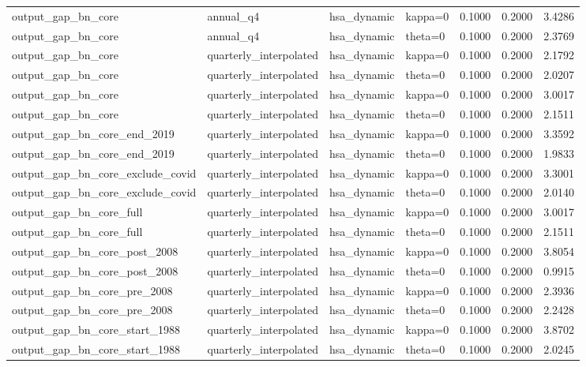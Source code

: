 \begin{tabular}{llllrrr}
output\_gap\_bn\_core & annual\_q4 & hsa\_dynamic & kappa=0 & 0.1000 & 0.2000 & 3.4286 \\
output\_gap\_bn\_core & annual\_q4 & hsa\_dynamic & theta=0 & 0.1000 & 0.2000 & 2.3769 \\
output\_gap\_bn\_core & quarterly\_interpolated & hsa\_dynamic & kappa=0 & 0.1000 & 0.2000 & 2.1792 \\
output\_gap\_bn\_core & quarterly\_interpolated & hsa\_dynamic & theta=0 & 0.1000 & 0.2000 & 2.0207 \\
output\_gap\_bn\_core & quarterly\_interpolated & hsa\_dynamic & kappa=0 & 0.1000 & 0.2000 & 3.0017 \\
output\_gap\_bn\_core & quarterly\_interpolated & hsa\_dynamic & theta=0 & 0.1000 & 0.2000 & 2.1511 \\
output\_gap\_bn\_core\_end\_2019 & quarterly\_interpolated & hsa\_dynamic & kappa=0 & 0.1000 & 0.2000 & 3.3592 \\
output\_gap\_bn\_core\_end\_2019 & quarterly\_interpolated & hsa\_dynamic & theta=0 & 0.1000 & 0.2000 & 1.9833 \\
output\_gap\_bn\_core\_exclude\_covid & quarterly\_interpolated & hsa\_dynamic & kappa=0 & 0.1000 & 0.2000 & 3.3001 \\
output\_gap\_bn\_core\_exclude\_covid & quarterly\_interpolated & hsa\_dynamic & theta=0 & 0.1000 & 0.2000 & 2.0140 \\
output\_gap\_bn\_core\_full & quarterly\_interpolated & hsa\_dynamic & kappa=0 & 0.1000 & 0.2000 & 3.0017 \\
output\_gap\_bn\_core\_full & quarterly\_interpolated & hsa\_dynamic & theta=0 & 0.1000 & 0.2000 & 2.1511 \\
output\_gap\_bn\_core\_post\_2008 & quarterly\_interpolated & hsa\_dynamic & kappa=0 & 0.1000 & 0.2000 & 3.8054 \\
output\_gap\_bn\_core\_post\_2008 & quarterly\_interpolated & hsa\_dynamic & theta=0 & 0.1000 & 0.2000 & 0.9915 \\
output\_gap\_bn\_core\_pre\_2008 & quarterly\_interpolated & hsa\_dynamic & kappa=0 & 0.1000 & 0.2000 & 2.3936 \\
output\_gap\_bn\_core\_pre\_2008 & quarterly\_interpolated & hsa\_dynamic & theta=0 & 0.1000 & 0.2000 & 2.2428 \\
output\_gap\_bn\_core\_start\_1988 & quarterly\_interpolated & hsa\_dynamic & kappa=0 & 0.1000 & 0.2000 & 3.8702 \\
output\_gap\_bn\_core\_start\_1988 & quarterly\_interpolated & hsa\_dynamic & theta=0 & 0.1000 & 0.2000 & 2.0245 \\

\end{tabular}
